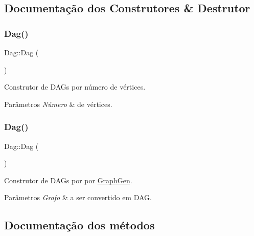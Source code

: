 \subsection{Documentação dos Construtores \& Destrutor}
\mbox{\label{classDag_a60039050421d45ed24d5fff16dd0b4d9}} 
\subsubsection{\texorpdfstring{Dag()}{Dag()}\hspace{0.1cm}{\footnotesize\ttfamily [1/2]}}
{\footnotesize\ttfamily Dag\+::\+Dag (\begin{DoxyParamCaption}\item[{int}]{ }\end{DoxyParamCaption})}

Construtor de D\+A\+Gs por número de vértices. 
\begin{DoxyParams}{Parâmetros}
{\em Número} & de vértices. \\
\hline
\end{DoxyParams}
\mbox{\label{classDag_a7ac03b3c8b13d4a85956eec57a1b8cd3}} 
\subsubsection{\texorpdfstring{Dag()}{Dag()}\hspace{0.1cm}{\footnotesize\ttfamily [2/2]}}
{\footnotesize\ttfamily Dag\+::\+Dag (\begin{DoxyParamCaption}\item[{\hyperlink{classGraphGen}{Graph\+Gen} \&}]{ }\end{DoxyParamCaption})}

Construtor de D\+A\+Gs por por \hyperlink{classGraphGen}{Graph\+Gen}. 
\begin{DoxyParams}{Parâmetros}
{\em Grafo} & a ser convertido em D\+AG. \\
\hline
\end{DoxyParams}


\subsection{Documentação dos métodos}
\mbox{\label{classDag_ac2f36e91443cfeea16640a81865110d2}} 
